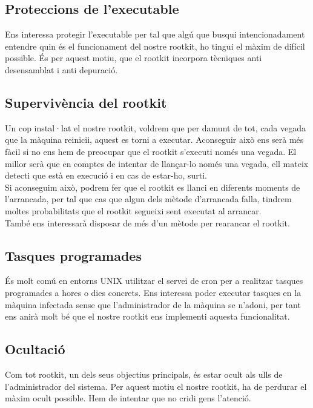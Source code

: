 \subsection{Proteccions de l'executable}
Ens interessa protegir l'executable per tal que algú que busqui intencionadament entendre quin és el funcionament del nostre rootkit,
ho tingui el màxim de difícil possible. És per aquest motiu, que el rootkit incorpora tècniques anti desensamblat i anti depuració.

\subsection{Supervivència del rootkit}
Un cop instal·lat el nostre rootkit, voldrem que per damunt de tot, cada vegada que la màquina reinicii, aquest es torni a executar. 
Aconseguir això ens serà més fàcil si no ens hem de preocupar que el rootkit s'executi només una vegada. El millor serà que en comptes
de intentar de llançar-lo només una vegada, ell mateix detecti que està en execució i en cas de estar-ho, surti. \\

Si aconseguim això, podrem fer que el rootkit es llanci en diferents moments de l'arrancada, per tal que cas que algun dels mètode 
d'arrancada falla, tindrem moltes probabilitats que el rootkit segueixi sent executat al arrancar. \\

També ens interessarà disposar de més d'un mètode per rearancar el rootkit.

\subsection{Tasques programades}
És molt comú en entorns UNIX utilitzar el servei de cron per a realitzar tasques programades a hores o dies concrets. Ens interessa
poder executar tasques en la màquina infectada sense que l'administrador de la màquina se n'adoni, per tant ens anirà molt bé que 
el nostre rootkit ens implementi aquesta funcionalitat.

\subsection{Ocultació}
Com tot rootkit, un dels seus objectius principals, és estar ocult als ulls de l'administrador del sistema. Per aquest motiu el 
nostre rootkit, ha de perdurar el màxim ocult possible. Hem de intentar que no cridi gens l'atenció.

